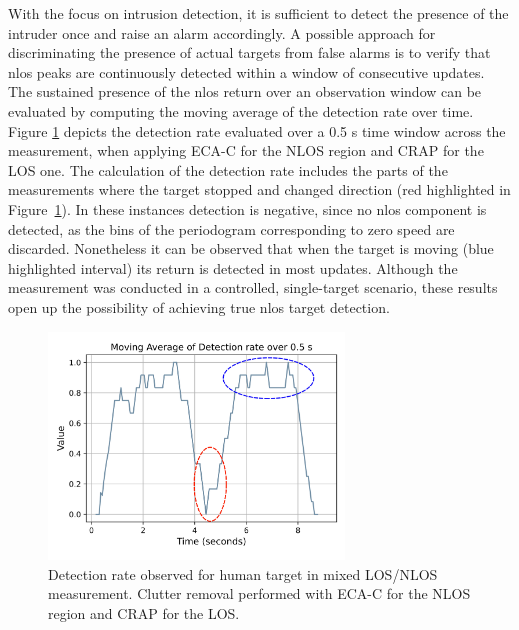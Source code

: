 With the focus on intrusion detection, it is sufficient to detect the presence of the intruder once and raise an alarm accordingly.
A possible approach for discriminating the presence of actual targets from false alarms is to verify that \gls{nlos} peaks are continuously detected within a window of consecutive updates.
The sustained presence of the \gls{nlos} return over an observation window can be evaluated by computing the moving average of the detection rate over time.
Figure \ref{fig:Test1_detect_mov_avg} depicts the detection rate evaluated over a 0.5 s time window across the measurement, when applying ECA-C for the NLOS region and CRAP for the LOS one.
The calculation of the detection rate includes the parts of the measurements where the target stopped and changed direction (red highlighted in Figure~\ref{fig:Test1_detect_mov_avg}).
In these instances detection is negative, since no \gls{nlos} component is detected, as the bins of the periodogram corresponding to zero speed are discarded.
Nonetheless it can be observed that when the target is moving (\eg blue highlighted interval) its return is detected in most updates.
Although the measurement was conducted in a controlled, single-target scenario, these results open up the possibility of achieving true \gls{nlos} target detection.

\begin{figure}[H]
	\centering
	\includegraphics[width=0.7\textwidth]{Images/exec_specific/detect_mov_avg_bluepoli_highlighted.png}
	\caption{\small Detection rate observed for human target in mixed LOS/NLOS measurement. Clutter removal performed with ECA-C for the NLOS region and CRAP for the LOS.}
	\label{fig:Test1_detect_mov_avg}
\end{figure}
